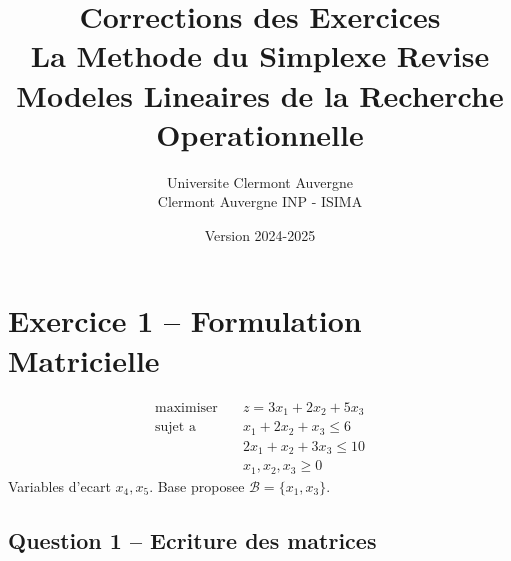 \documentclass[12pt,a4paper]{article}
\title{\textbf{\Huge\color{titrebleu}Corrections des Exercices}\\[0.5em]
\large\color{defvert}La Methode du Simplexe Revise\\
\small Modeles Lineaires de la Recherche Operationnelle}
\author{\large Universite Clermont Auvergne\\
\small Clermont Auvergne INP - ISIMA}
\date{\large Version 2024-2025}
\begin{document}
\maketitle
\tableofcontents
\newpage

\section{Exercice 1 -- Formulation Matricielle}

\begin{enonce}
\begin{align*}
\text{maximiser} \quad & z = 3x_1 + 2x_2 + 5x_3\\
\text{sujet a} \quad & x_1 + 2x_2 + x_3 \leq 6\\
& 2x_1 + x_2 + 3x_3 \leq 10\\
& x_1, x_2, x_3 \geq 0
\end{align*}
Variables d'ecart $x_4, x_5$. Base proposee $\mathcal{B} = \{x_1, x_3\}$.
\end{enonce}

\subsection{Question 1 -- Ecriture des matrices}
\end{document}
